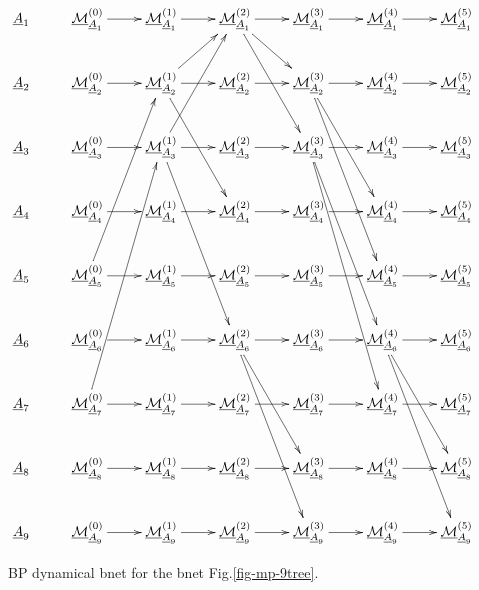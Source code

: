 \begin{figure}[h!]
$$\xymatrix{
\rvA_1
&\ucalm^{(0)}_{\rvA_1}\ar[r]
&\ucalm^{(1)}_{\rvA_1}\ar[r]
&\ucalm^{(2)}_{\rvA_1}\ar[r]\ar[dr]\ar[ddr]
&\ucalm^{(3)}_{\rvA_1}\ar[r]
&\ucalm^{(4)}_{\rvA_1}\ar[r]
&\ucalm^{(5)}_{\rvA_1}
\\
\rvA_2
&\ucalm^{(0)}_{\rvA_2}\ar[r]
&\ucalm^{(1)}_{\rvA_2}\ar[r]\ar[ur]\ar[ddr]
&\ucalm^{(2)}_{\rvA_2}\ar[r]
&\ucalm^{(3)}_{\rvA_2}\ar[r]\ar[ddr]\ar[dddr]
&\ucalm^{(4)}_{\rvA_2}\ar[r]
&\ucalm^{(5)}_{\rvA_2}
\\
\rvA_3
&\ucalm^{(0)}_{\rvA_3}\ar[r]
&\ucalm^{(1)}_{\rvA_3}\ar[r]\ar[uur]\ar[dddr]
&\ucalm^{(2)}_{\rvA_3}\ar[r]
&\ucalm^{(3)}_{\rvA_3}\ar[r]\ar[dddr]\ar[ddddr]
&\ucalm^{(4)}_{\rvA_3}\ar[r]
&\ucalm^{(5)}_{\rvA_3}
\\
\rvA_4
&\ucalm^{(0)}_{\rvA_4}\ar[r]
&\ucalm^{(1)}_{\rvA_4}\ar[r]
&\ucalm^{(2)}_{\rvA_4}\ar[r]
&\ucalm^{(3)}_{\rvA_4}\ar[r]
&\ucalm^{(4)}_{\rvA_4}\ar[r]
&\ucalm^{(5)}_{\rvA_4}
\\
\rvA_5
&\ucalm^{(0)}_{\rvA_5}\ar[r]\ar[uuur]
&\ucalm^{(1)}_{\rvA_5}\ar[r]
&\ucalm^{(2)}_{\rvA_5}\ar[r]
&\ucalm^{(3)}_{\rvA_5}\ar[r]
&\ucalm^{(4)}_{\rvA_5}\ar[r]
&\ucalm^{(5)}_{\rvA_5}
\\
\rvA_6
&\ucalm^{(0)}_{\rvA_6}\ar[r]
&\ucalm^{(1)}_{\rvA_6}\ar[r]
&\ucalm^{(2)}_{\rvA_6}\ar[r]\ar[ddr]\ar[dddr]
&\ucalm^{(3)}_{\rvA_6}\ar[r]
&\ucalm^{(4)}_{\rvA_6}\ar[r]\ar[ddr]\ar[dddr]
&\ucalm^{(5)}_{\rvA_6}
\\
\rvA_7
&\ucalm^{(0)}_{\rvA_7}\ar[r]\ar[uuuur]
&\ucalm^{(1)}_{\rvA_7}\ar[r]
&\ucalm^{(2)}_{\rvA_7}\ar[r]
&\ucalm^{(3)}_{\rvA_7}\ar[r]
&\ucalm^{(4)}_{\rvA_7}\ar[r]
&\ucalm^{(5)}_{\rvA_7}
\\
\rvA_8
&\ucalm^{(0)}_{\rvA_8}\ar[r]
&\ucalm^{(1)}_{\rvA_8}\ar[r]
&\ucalm^{(2)}_{\rvA_8}\ar[r]
&\ucalm^{(3)}_{\rvA_8}\ar[r]
&\ucalm^{(4)}_{\rvA_8}\ar[r]
&\ucalm^{(5)}_{\rvA_8}
\\
\rvA_9
&\ucalm^{(0)}_{\rvA_9}\ar[r]
&\ucalm^{(1)}_{\rvA_9}\ar[r]
&\ucalm^{(2)}_{\rvA_9}\ar[r]
&\ucalm^{(3)}_{\rvA_9}\ar[r]
&\ucalm^{(4)}_{\rvA_9}\ar[r]
&\ucalm^{(5)}_{\rvA_9}
\\
}$$
\caption{BP dynamical bnet for the bnet
Fig.\ref{fig-mp-9tree}.}
\label{fig-propagation-9tree}
\end{figure}

